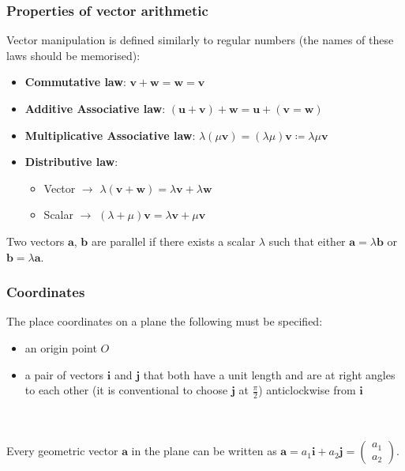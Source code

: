 \documentclass{report}
\begin{document}
		\subsubsection{Properties of vector arithmetic}

			Vector manipulation is defined similarly to regular numbers (the names of these laws should be memorised):
			
				\begin{itemize}
					\item \textbf{Commutative law}: $\textbf{v} + \textbf{w} = \textbf{w} = \textbf{v}$
					\item \textbf{Additive Associative law}: $(\textbf{u} + \textbf{v}) + \textbf{w} = \textbf{u} + (\textbf{v} = \textbf{w})$
					\item \textbf{Multiplicative Associative law}: $\lambda (\mu \textbf{v}) = (\lambda \mu) \textbf{v} \coloneq \lambda \mu \textbf{v}$
					\item \textbf{Distributive law}:
						\begin{itemize}
							\item Vector $\rightarrow$ $\lambda (\textbf{v} + \textbf{w}) = \lambda \textbf{v} + \lambda \textbf{w}$
							\item Scalar $\rightarrow$ $(\lambda + \mu) \textbf{v} = \lambda \textbf{v} + \mu \textbf{v}$
						\end{itemize}
				\end{itemize}

			Two vectors $\textbf{a}$, $\textbf{b}$ are parallel if there exists a scalar $\lambda$ such that either $\textbf{a} = \lambda \textbf{b}$ or $\textbf{b} = \lambda \textbf{a}$.

		\subsubsection{Coordinates}
			
			The place coordinates on a plane the following must be specified:
				\begin{itemize}
					\item an origin point $O$
					\item a pair of vectors $\textbf{i}$ and $\textbf{j}$ that both have a unit length and are at right angles to each other (it is conventional to choose $\textbf{j}$ at $\frac{\pi}{2}$) anticlockwise from $\textbf{i}$
				\end{itemize}
			\\ \\
			Every geometric vector $\textbf{a}$ in the plane can be written as $\textbf{a} = a_1 \textbf{i} + a_2 \textbf{j} = \begin{pmatrix}a_1\\a_2\end{pmatrix}$.
\end{document}
